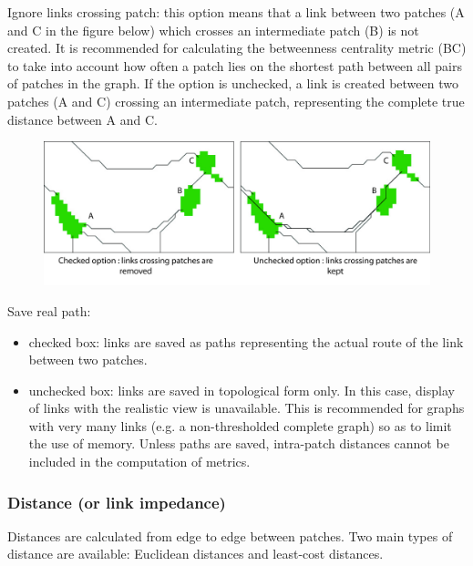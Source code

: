 \documentclass{article}
\begin{document}
Ignore links crossing patch: this option means that a link between two patches (A and C in the figure below) which crosses an intermediate patch (B) is not created. It is recommended for calculating the betweenness centrality metric (BC) to take into account how often a patch lies on the shortest path between all pairs of patches in the graph. If the option is unchecked, a link is created between two patches (A and C) crossing an intermediate patch, representing the complete true distance between A and C.

\begin{figure}[H]
	\includegraphics[scale=0.1]{img/manual-en_img5.jpg}
\end{figure}


Save real path: 
\begin{itemize}
	\item checked box: links are saved as paths representing the actual route of the link between two patches.
	\item unchecked box: links are saved in topological form only. In this case, display of links with the realistic view is unavailable. This is recommended for graphs with very many links (e.g. a non-thresholded complete graph) so as to limit the use of memory. Unless paths are saved, intra-patch distances cannot be included in the computation of metrics.
\end{itemize}

\subsubsection{Distance (or link impedance)}

Distances are calculated from edge to edge between patches. Two main types of distance are available: Euclidean distances and least-cost distances.
\end{document}
